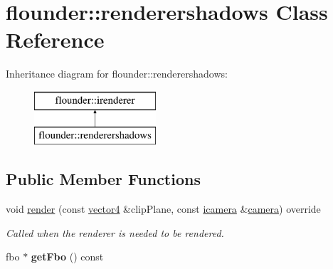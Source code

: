 \hypertarget{classflounder_1_1renderershadows}{}\section{flounder\+:\+:renderershadows Class Reference}
\label{classflounder_1_1renderershadows}
Inheritance diagram for flounder\+:\+:renderershadows\+:\begin{figure}[H]
\begin{center}
\leavevmode
\includegraphics[height=2.000000cm]{classflounder_1_1renderershadows}
\end{center}
\end{figure}
\subsection*{Public Member Functions}
\begin{DoxyCompactItemize}
\item 
void \hyperlink{classflounder_1_1renderershadows_ae07dca156c479cdb82e8821a4f29a6c3}{render} (const \hyperlink{classflounder_1_1vector4}{vector4} \&clip\+Plane, const \hyperlink{classflounder_1_1icamera}{icamera} \&\hyperlink{classflounder_1_1camera}{camera}) override
\begin{DoxyCompactList}\small\item\em Called when the renderer is needed to be rendered. \end{DoxyCompactList}\item 
\mbox{\label{classflounder_1_1renderershadows_a80e01deb3e34f921ffa30d7f9984c304}} 
fbo $\ast$ {\bfseries get\+Fbo} () const
\end{DoxyCompactItemize}

